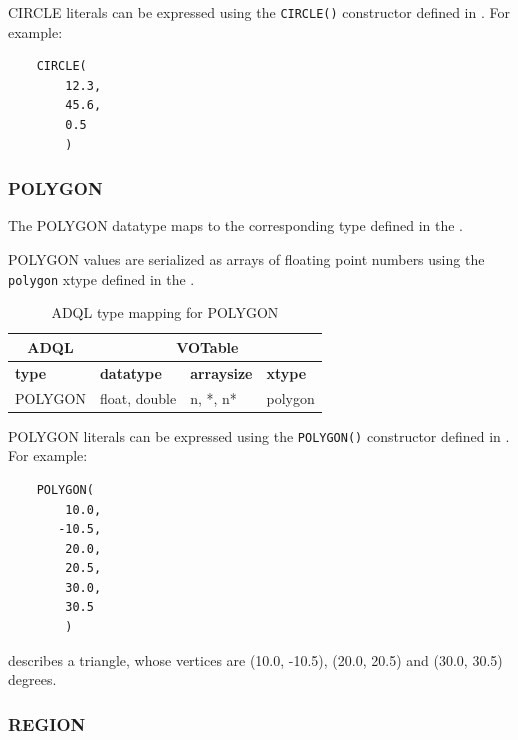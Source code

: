 \documentclass[11pt,a4paper]{ivoa}
\begin{document}
CIRCLE literals can be expressed using the \verb:CIRCLE():
constructor defined in .
For example:
\begin{verbatim}
    CIRCLE(
        12.3,
        45.6,
        0.5
        )
\end{verbatim}

\subsubsection{POLYGON}
\label{sec:types.geom.polygon}

The POLYGON datatype maps to the corresponding type defined in the
\DALISpec.

POLYGON values are serialized as arrays of floating point numbers
using the \verb:polygon: xtype defined in the \DALISpec.

\begin{table}[th]\footnotesize
    \begin{tabular}
        {|p{}|p{}|p{}|p{}|}
        \hline

        \hline
        \multicolumn{1}{|c|}{\textbf{ADQL}} &
        \multicolumn{3}{|c|}{\textbf{VOTable}}
        \tabularnewline
        
        \hline
        \textbf{type} &
        \textbf{datatype} &
        \textbf{arraysize} &
        \textbf{xtype}
        \tabularnewline

        \hline
        POLYGON &
        float, double &
        n, *, n* &
        polygon
        \tabularnewline

        \hline
    \end{tabular}
    \caption{ADQL type mapping for POLYGON}
    \label{table:types.geom.polygon}
\end{table}

POLYGON literals can be expressed using the \verb:POLYGON():
constructor defined in .
For example:
\begin{verbatim}
    POLYGON(
        10.0,
       -10.5,
        20.0,
        20.5,
        30.0,
        30.5
        )
\end{verbatim}
\noindent
describes a triangle, whose vertices are (10.0, -10.5), (20.0, 20.5)
and (30.0, 30.5) degrees.

\subsubsection{REGION}
\label{sec:types.geom.region}
\end{document}
